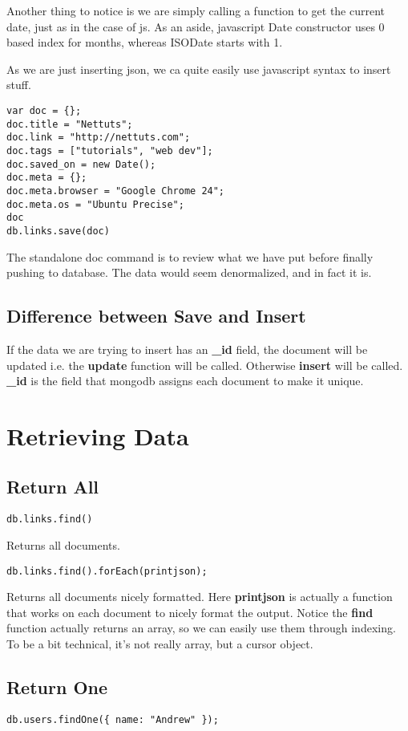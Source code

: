 \documentclass[a4paper, 12pt]{article}
\begin{document}
Another thing to notice is we are simply calling a function to get the current date, just as in the case of js. As an aside, javascript Date constructor uses 0 based index for months, whereas ISODate starts with 1.

As we are just inserting json, we ca quite easily use javascript syntax to insert stuff.
\begin{verbatim}
var doc = {};
doc.title = "Nettuts";
doc.link = "http://nettuts.com";
doc.tags = ["tutorials", "web dev"];
doc.saved_on = new Date();
doc.meta = {};
doc.meta.browser = "Google Chrome 24";
doc.meta.os = "Ubuntu Precise";
doc
db.links.save(doc)
\end{verbatim}
The standalone doc command is to review what we have put before finally pushing to database. The data would seem denormalized, and in fact it is.
\subsection{Difference between Save and Insert}
If the data we are trying to insert has an \textbf{\_id} field, the document will be updated i.e. the \textbf{update} function will be called. Otherwise \textbf{insert} will be called. \textbf{\_id} is the field that mongodb assigns each document to make it unique.

\section{Retrieving Data}
\subsection{Return All}
\begin{verbatim}
db.links.find()
\end{verbatim}
Returns all documents.
\begin{verbatim}
db.links.find().forEach(printjson);
\end{verbatim}
Returns all documents nicely formatted. Here \textbf{printjson} is actually a function that works on each document to nicely format the output. Notice the \textbf{find} function actually returns an array, so we can easily use them through indexing. To be a bit technical, it's not really array, but a cursor object. 
\subsection{Return One}
\begin{verbatim}
db.users.findOne({ name: "Andrew" });
\end{verbatim}
\end{document}
